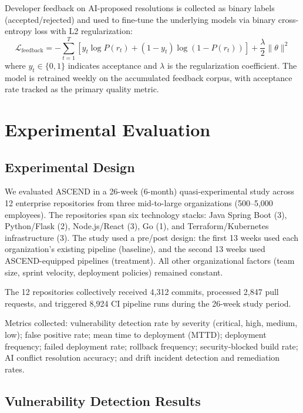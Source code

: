 \documentclass[journal]{IEEEtran}
\begin{document}
Developer feedback on AI-proposed resolutions is collected as binary labels (accepted/rejected) and used to fine-tune the underlying models via binary cross-entropy loss with L2 regularization:
\begin{equation}
\mathcal{L}_{\text{feedback}} = -\sum_{t=1}^{T}\left[y_t \log P(r_t) + (1-y_t)\log(1-P(r_t))\right] + \frac{\lambda}{2}\|\theta\|^2
\label{eq:loss}
\end{equation}
where $y_t \in \{0,1\}$ indicates acceptance and $\lambda$ is the regularization coefficient. The model is retrained weekly on the accumulated feedback corpus, with acceptance rate tracked as the primary quality metric.

\section{Experimental Evaluation}
\label{sec:evaluation}

\subsection{Experimental Design}

We evaluated ASCEND in a 26-week (6-month) quasi-experimental study across 12 enterprise repositories from three mid-to-large organizations (500--5,000 employees). The repositories span six technology stacks: Java Spring Boot (3), Python/Flask (2), Node.js/React (3), Go (1), and Terraform/Kubernetes infrastructure (3). The study used a pre/post design: the first 13 weeks used each organization's existing pipeline (baseline), and the second 13 weeks used ASCEND-equipped pipelines (treatment). All other organizational factors (team size, sprint velocity, deployment policies) remained constant.

The 12 repositories collectively received 4,312 commits, processed 2,847 pull requests, and triggered 8,924 CI pipeline runs during the 26-week study period.

Metrics collected: vulnerability detection rate by severity (critical, high, medium, low); false positive rate; mean time to deployment (MTTD); deployment frequency; failed deployment rate; rollback frequency; security-blocked build rate; AI conflict resolution accuracy; and drift incident detection and remediation rates.

\subsection{Vulnerability Detection Results}
\end{document}
